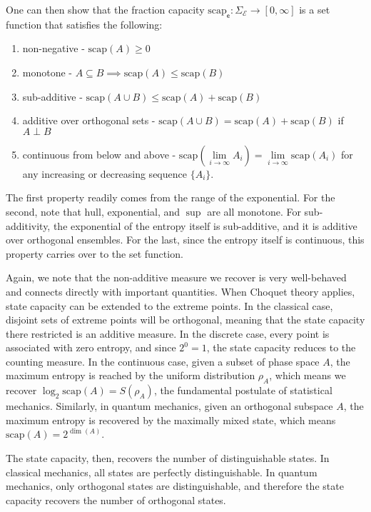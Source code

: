 \documentclass[10pt,twocolumn, nofootinbib]{revtex4-2}
\newcommand\hull{\mathrm{hull}}
\newcommand\capacity{\mathrm{scap}}
\newcommand{\ens}[1][e] {\mathsf{#1}} %
\newcommand{\Ens}[1][E] {\mathcal{#1}} %
\def\ortho{\perp}
\begin{document}
One can then show that the fraction capacity $\capacity_{\ens} : \Sigma_{\Ens} \to [0,\infty]$ is a set function that satisfies the following:
\begin{enumerate}
	\item non-negative - $\capacity(A)\geq 0$
	\item monotone - $A \subseteq B \implies \capacity(A) \leq \capacity(B)$
	\item sub-additive - $\capacity(A \cup B) \leq \capacity(A) + \capacity(B)$
	\item additive over orthogonal sets - $\capacity(A \cup B) = \capacity(A) + \capacity(B)$ if $A \ortho B$
	\item continuous from below and above - $\capacity(\lim\limits_{i \to \infty} A_i) = \lim\limits_{i \to \infty} \capacity(A_i)$ for any increasing or decreasing sequence $\{A_i\}$.
\end{enumerate}

The first property readily comes from the range of the exponential. For the second, note that $\hull$, exponential, and $\sup$ are all monotone. For sub-additivity, the exponential of the entropy itself is sub-additive, and it is additive over orthogonal ensembles. For the last, since the entropy itself is continuous, this property carries over to the set function.

Again, we note that the non-additive measure we recover is very well-behaved and connects directly with important quantities. When Choquet theory applies, state capacity can be extended to the extreme points. In the classical case, disjoint sets of extreme points will be orthogonal, meaning that the state capacity there restricted is an additive measure. In the discrete case, every point is associated with zero entropy, and since $2^0=1$, the state capacity reduces to the counting measure. In the continuous case, given a subset of phase space $A$, the maximum entropy is reached by the uniform distribution $\rho_A$, which means we recover $\log_2 \capacity(A) = S(\rho_A)$, the fundamental postulate of statistical mechanics. Similarly, in quantum mechanics, given an orthogonal subspace $A$, the maximum entropy is recovered by the maximally mixed state, which means $\capacity(A) = 2^{\dim(A)}$.

The state capacity, then, recovers the number of distinguishable states. In classical mechanics, all states are perfectly distinguishable. In quantum mechanics, only orthogonal states are distinguishable, and therefore the state capacity recovers the number of orthogonal states.
\end{document}
